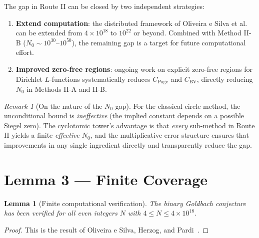 \documentclass[11pt,a4paper]{article}
\newtheorem{lemma}[theorem]{Lemma}
\theoremstyle{remark}
\newtheorem{remark}[theorem]{Remark}
\begin{document}
The gap in Route II can be closed by two independent strategies:
\begin{enumerate}[nosep]
  \item \textbf{Extend computation}: the distributed framework of
    Oliveira e Silva et al.~\cite{OSP2014} can be extended from
    $4\times 10^{18}$ to $10^{22}$ or beyond.  Combined with
    Method II-B ($N_0 \sim 10^{30}$--$10^{50}$), the remaining gap
    is a target for future computational effort.

  \item \textbf{Improved zero-free regions}: ongoing work on explicit
    zero-free regions for Dirichlet $L$-functions systematically
    reduces $C_{\text{Page}}$ and $C_{\text{BV}}$, directly reducing
    $N_0$ in Methods II-A and II-B.
\end{enumerate}

\begin{remark}[On the nature of the $N_0$ gap]
For the classical circle method, the unconditional bound is
\emph{ineffective} (the implied constant depends on a possible Siegel
zero).  The cyclotomic tower's advantage is that \emph{every} sub-method
in Route II yields a finite \emph{effective} $N_0$, and the
multiplicative error structure ensures that improvements in any single
ingredient directly and transparently reduce the gap.
\end{remark}

\section{Lemma 3 --- Finite Coverage}
\label{sec:finite}

\begin{lemma}[Finite computational verification]
\label{lem:finite}
The binary Goldbach conjecture has been verified for all even integers
$N$ with $4 \leq N \leq 4\times 10^{18}$.
\end{lemma}

\begin{proof}
This is the result of Oliveira e Silva, Herzog, and
Pardi~\cite{OSP2014}.
\end{proof}

\end{document}

